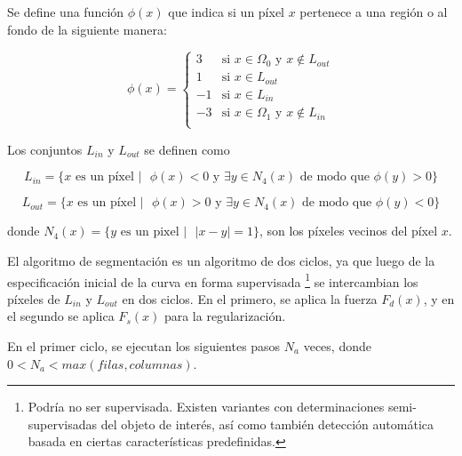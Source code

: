 Se define una función $\phi(x)$ que indica si un píxel $x$ pertenece a una región o al fondo de la siguiente manera:

\begin{equation}
\phi(x) =
\left\{
    \begin{array}{ll}
        3  & \mbox{si } x \in \Omega_{0} \mbox{  y  } x \notin L_{out} \\
        1  & \mbox{si } x \in L_{out}\\
        -1  & \mbox{si } x \in L_{in}\\
        -3 & \mbox{si } x \in \Omega_{1} \mbox{  y  } x \notin L_{in} \\
    \end{array}
\right.
\end{equation}

Los conjuntos $L_{in}$ y $L_{out}$ se definen como

\begin{equation}
    L_{in} = \{ x \mbox{ es un píxel } \vert \mbox{    }  \phi(x) < 0 \mbox{ y } \exists y \in N_{4}(x) \mbox{ de modo que } \phi(y) > 0 \}
\end{equation}

\begin{equation}
    L_{out} = \{ x \mbox{ es un píxel } \vert \mbox{    } \phi(x) > 0 \mbox{ y } \exists y \in N_{4}(x) \mbox{ de modo que } \phi(y) < 0 \}
\end{equation}

donde $N_{4}(x) = \{ y \mbox{ es un pixel } \vert \mbox{   } |x-y| = 1 \}$, son los píxeles
vecinos del píxel $x$.

El algoritmo de segmentación es un algoritmo de dos ciclos, ya que luego de la
especificación inicial de la curva en forma supervisada \footnote{Podría no ser
supervisada. Existen variantes con determinaciones semi-supervisadas del objeto
de interés, así como también detección automática basada en ciertas
características predefinidas.} se intercambian los píxeles de $L_{in}$ y
$L_{out}$ en dos ciclos. En el primero, se aplica la fuerza $F_{d}(x)$, y en el
segundo se aplica $F_{s}(x)$ para la regularización.

En el primer ciclo, se ejecutan los siguientes pasos $N_{a}$ veces, donde $ 0 <
N_{a} < max(filas, columnas)$.

